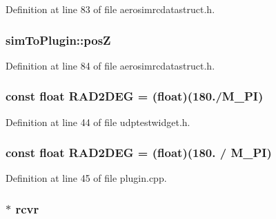 Definition at line 83 of file aerosimrcdatastruct.\-h.

\hypertarget{group___aero_sim_r_c_gab66796c7082a7d42685f8c8c3b282c43}{
\subsubsection[{pos\-Z}]{ sim\-To\-Plugin\-::pos\-Z}}\label{group___aero_sim_r_c_gab66796c7082a7d42685f8c8c3b282c43}


Definition at line 84 of file aerosimrcdatastruct.\-h.

\hypertarget{group___aero_sim_r_c_gabb429aecc5bba8de3564e19ded7ef104}{
\subsubsection[{R\-A\-D2\-D\-E\-G}]{\setlength{\rightskip}{0pt plus 5cm}const {\bf float} R\-A\-D2\-D\-E\-G = ({\bf float})(180./M\-\_\-\-P\-I)}}\label{group___aero_sim_r_c_gabb429aecc5bba8de3564e19ded7ef104}


Definition at line 44 of file udptestwidget.\-h.

\hypertarget{group___aero_sim_r_c_gabb429aecc5bba8de3564e19ded7ef104}{
\subsubsection[{R\-A\-D2\-D\-E\-G}]{\setlength{\rightskip}{0pt plus 5cm}const {\bf float} R\-A\-D2\-D\-E\-G = ({\bf float})(180. / M\-\_\-\-P\-I)}}\label{group___aero_sim_r_c_gabb429aecc5bba8de3564e19ded7ef104}


Definition at line 45 of file plugin.\-cpp.

\hypertarget{group___aero_sim_r_c_gaad1d57ea59d2f9fca3e53c6fb20ac134}{
\subsubsection[{rcvr}]{$\ast$ rcvr}}\label{group___aero_sim_r_c_gaad1d57ea59d2f9fca3e53c6fb20ac134}


